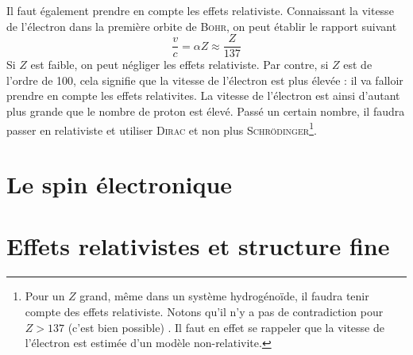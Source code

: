 Il faut également prendre en compte les effets relativiste. Connaissant la vitesse de l'électron dans 
la première orbite de \textsc{Bohr}, on peut établir le rapport suivant
\begin{equation}
\frac{v}{c} = \alpha Z \approx \frac{Z}{137}
\end{equation}
Si $Z$ est faible, on peut négliger les effets relativiste. Par contre, si $Z$ est de l'ordre de 100, cela
signifie que la vitesse de l'électron est plus élevée : il va falloir prendre en compte les effets 
relativites. La vitesse de l'électron est ainsi d'autant plus grande que le nombre de proton est élevé. 
Passé un certain nombre, il faudra passer en relativiste et utiliser \textsc{Dirac} et non plus
\textsc{Schrödinger}\footnote{Pour un $Z$ grand, même dans un système hydrogénoïde, il faudra tenir compte
des effets relativiste. Notons qu'il n'y a pas de contradiction pour $Z>137$ (c'est bien possible) . Il 
faut en effet se rappeler que la vitesse de l'électron est estimée d'un modèle non-relativite.}.



















\section{Le spin électronique}
\section{Effets relativistes et structure fine}
